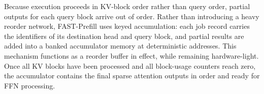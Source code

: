 \documentclass[conference]{IEEEtran}
\begin{document}
Because execution proceeds in KV-block order rather than query order, partial outputs for each query block arrive out of order. Rather than introducing a heavy reorder network, FAST-Prefill uses keyed accumulation: each job record carries the identifiers of its destination head and query block, and partial results are added into a banked accumulator memory at deterministic addresses. This mechanism functions as a reorder buffer in effect, while remaining hardware-light. Once all KV blocks have been processed and all block-usage counters reach zero, the accumulator contains the final sparse attention outputs in order and ready for FFN processing.


\end{document}
